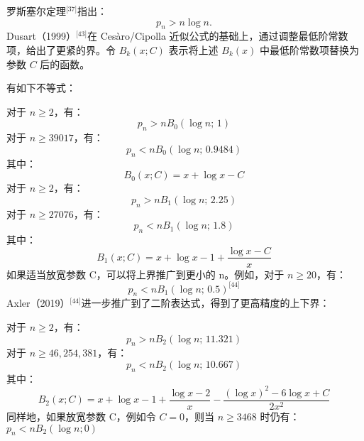 罗斯塞尔定理\(^\text{[37]}\)指出：
$$
p_n > n \log n.~
$$
Dusart（1999）\(^\text{[43]}\)在 Cesàro/Cipolla 近似公式的基础上，通过调整最低阶常数项，给出了更紧的界。令 $B_k(x; C)$ 表示将上述 $B_k(x)$ 中最低阶常数项替换为参数 $C$ 后的函数。

有如下不等式：

对于 $n \geq 2$，有：
$$
p_n > n B_0(\log n;\, 1)~
$$
对于 $n \geq 39017$，有：
$$
p_n < n B_0(\log n;\, 0.9484)~
$$
其中：
$$
B_0(x; C) = x + \log x - C~
$$
对于 $n \geq 2$，有：
$$
p_n > n B_1(\log n;\, 2.25)~
$$
对于 $n \geq 27076$，有：
$$
p_n < n B_1(\log n;\, 1.8)~
$$
其中：
$$
B_1(x; C) = x + \log x - 1 + \frac{\log x - C}{x}~
$$
如果适当放宽参数 C，可以将上界推广到更小的 n。例如，对于 $n \geq 20$，有：
$$
p_n < n B_1(\log n;\, 0.5)^\text{[44]}~
$$
Axler（2019）\(^\text{[44]}\)进一步推广到了二阶表达式，得到了更高精度的上下界：

对于 \( n \geq 2 \)，有：
$$
p_n > n B_2(\log n;\, 11.321)~
$$
对于 $n \geq 46,\!254,\!381$，有：
$$
p_n < n B_2(\log n;\, 10.667)~
$$
其中：
$$
B_2(x; C) = x + \log x - 1 + \frac{\log x - 2}{x} - \frac{(\log x)^2 - 6 \log x + C}{2 x^2}~
$$
同样地，如果放宽参数 C，例如令 $C = 0$，则当 $n \geq 3468$ 时仍有：$p_n < n B_2(\log n; 0)$
